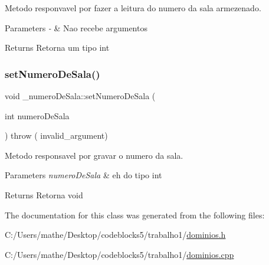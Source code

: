Metodo responvavel por fazer a leitura do numero da sala armezenado. 


\begin{DoxyParams}{Parameters}
{\em -\/} & Nao recebe argumentos \\
\hline
\end{DoxyParams}
\begin{DoxyReturn}{Returns}
Retorna um tipo int 
\end{DoxyReturn}
\mbox{\label{class__numero_de_sala_a06170bd2313e32c17f0a4e212c283f33}} 
\subsubsection{\texorpdfstring{setNumeroDeSala()}{setNumeroDeSala()}}
{\footnotesize\ttfamily void \+\_\+numero\+De\+Sala\+::set\+Numero\+De\+Sala (\begin{DoxyParamCaption}\item[{int}]{numero\+De\+Sala }\end{DoxyParamCaption}) throw ( invalid\+\_\+argument) }



Metodo responsavel por gravar o numero da sala. 


\begin{DoxyParams}{Parameters}
{\em numero\+De\+Sala} & eh do tipo int \\
\hline
\end{DoxyParams}
\begin{DoxyReturn}{Returns}
Retorna void 
\end{DoxyReturn}


The documentation for this class was generated from the following files\+:\begin{DoxyCompactItemize}
\item 
C\+:/\+Users/mathe/\+Desktop/codeblocks5/trabalho1/\mbox{\hyperlink{dominios_8h}{dominios.\+h}}\item 
C\+:/\+Users/mathe/\+Desktop/codeblocks5/trabalho1/\mbox{\hyperlink{dominios_8cpp}{dominios.\+cpp}}\end{DoxyCompactItemize}
